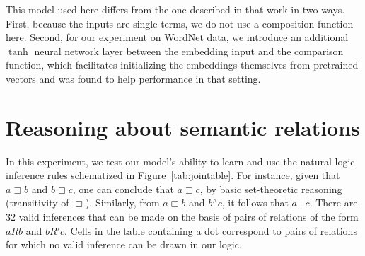 \documentclass[letterpaper]{article}
\newcommand{\natneg}{\mathbin{^{\wedge}}}
\newcommand{\natfor}{\sqsubset}
\newcommand{\natrev}{\sqsupset}
\newcommand{\natalt}{\mathbin{|}}
\def\ii#1{\textit{#1}}
\begin{document}
This model used here differs from the one described in that work in
two ways. First, because the inputs are single terms, we do not use
a composition function here. Second, for our experiment on WordNet data, 
we introduce an additional $\tanh$ neural network layer between the embedding 
input and the comparison function, which facilitates initializing the 
embeddings themselves from pretrained vectors and was found to help 
performance in that setting.


\section{Reasoning about semantic relations}\label{sec:join}

In this experiment, we test our model's ability to learn and use the
natural logic inference rules schematized in
Figure~\ref{tab:jointable}. For instance, given that $a \natrev b$ and
$b \natrev c$, one can conclude that $a \natrev c$, by basic
set-theoretic reasoning (transitivity of $\natrev$). Similarly, from
$a \natfor b$ and $b \natneg c$, it follows that $a \natalt c$.  There
are 32 valid inferences that can be made on the basis of pairs of
relations of the form $a R b$ and $b R' c$. Cells in the table
containing a dot correspond to pairs of relations for which no valid
inference can be drawn in our logic.

\end{document}
